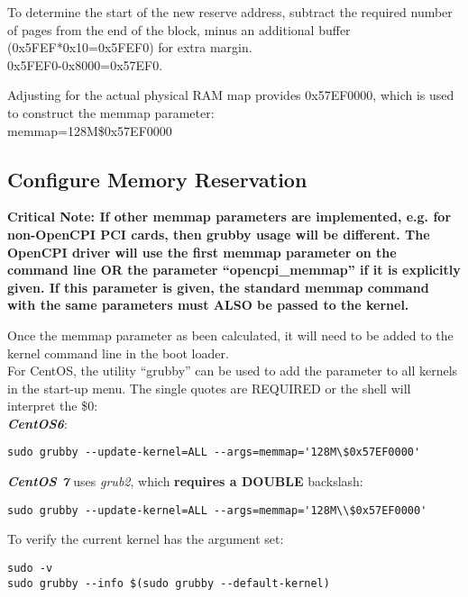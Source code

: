 \begin{flushleft}
To determine the start of the new reserve address, subtract the
required number of pages from the end of the block, minus an additional buffer (0x5FEF*0x10=0x5FEF0) for extra margin. \\ \medskip
0x5FEF0-0x8000=0x57EF0. \\ \medskip

Adjusting for the actual physical RAM map provides 0x57EF0000, which is used to construct the memmap parameter:\\ \medskip
memmap=128M\$0x57EF0000\\

\subsection{Configure Memory Reservation}
\textbf{Critical Note:
If other memmap parameters are implemented, e.g. for non-OpenCPI PCI cards, then grubby usage will be different. The OpenCPI driver will use the first memmap parameter on the command line OR the parameter ``opencpi\_memmap'' if it is explicitly given. If this parameter is given, the standard memmap command with the same parameters must ALSO be passed to the kernel.}\\ \bigskip

Once the memmap parameter as been calculated, it will need to be added to the kernel command line in the boot loader. \\
\bigskip
For CentOS, the utility ``grubby'' can be used to add the parameter to all kernels in the start-up menu. The single quotes are REQUIRED or the shell will interpret the \$0: \\
\bigskip
\textbf{\textit{CentOS6}}:\\
\begin{lstlisting}
sudo grubby --update-kernel=ALL --args=memmap='128M\$0x57EF0000'
\end{lstlisting}
\textbf{\textit{CentOS 7}} uses \textit{grub2}, which \textbf{requires a DOUBLE} backslash:\\
\begin{lstlisting}
sudo grubby --update-kernel=ALL --args=memmap='128M\\$0x57EF0000'
\end{lstlisting}

To verify the current kernel has the argument set:\\
\begin{lstlisting}
sudo -v
sudo grubby --info $(sudo grubby --default-kernel)
\end{lstlisting}


\end{flushleft}
